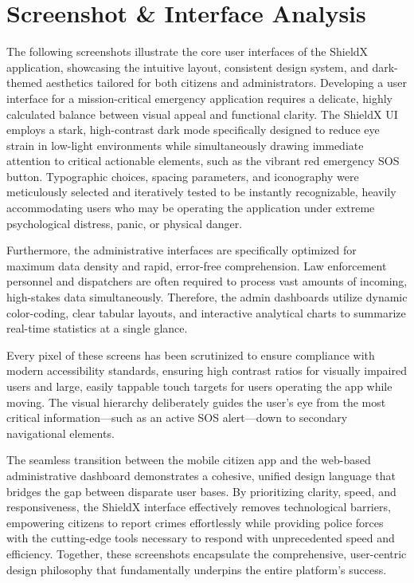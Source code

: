 \documentclass[12pt, a4paper, twoside, openany]{report}
\begin{document}
\section{Screenshot \& Interface Analysis}
The following screenshots illustrate the core user interfaces of the ShieldX application, showcasing the intuitive layout, consistent design system, and dark-themed aesthetics tailored for both citizens and administrators. Developing a user interface for a mission-critical emergency application requires a delicate, highly calculated balance between visual appeal and functional clarity. The ShieldX UI employs a stark, high-contrast dark mode specifically designed to reduce eye strain in low-light environments while simultaneously drawing immediate attention to critical actionable elements, such as the vibrant red emergency SOS button. Typographic choices, spacing parameters, and iconography were meticulously selected and iteratively tested to be instantly recognizable, heavily accommodating users who may be operating the application under extreme psychological distress, panic, or physical danger.

Furthermore, the administrative interfaces are specifically optimized for maximum data density and rapid, error-free comprehension. Law enforcement personnel and dispatchers are often required to process vast amounts of incoming, high-stakes data simultaneously. Therefore, the admin dashboards utilize dynamic color-coding, clear tabular layouts, and interactive analytical charts to summarize real-time statistics at a single glance. 

Every pixel of these screens has been scrutinized to ensure compliance with modern accessibility standards, ensuring high contrast ratios for visually impaired users and large, easily tappable touch targets for users operating the app while moving. The visual hierarchy deliberately guides the user's eye from the most critical information—such as an active SOS alert—down to secondary navigational elements. 

The seamless transition between the mobile citizen app and the web-based administrative dashboard demonstrates a cohesive, unified design language that bridges the gap between disparate user bases. By prioritizing clarity, speed, and responsiveness, the ShieldX interface effectively removes technological barriers, empowering citizens to report crimes effortlessly while providing police forces with the cutting-edge tools necessary to respond with unprecedented speed and efficiency. Together, these screenshots encapsulate the comprehensive, user-centric design philosophy that fundamentally underpins the entire platform's success.
\end{document}
